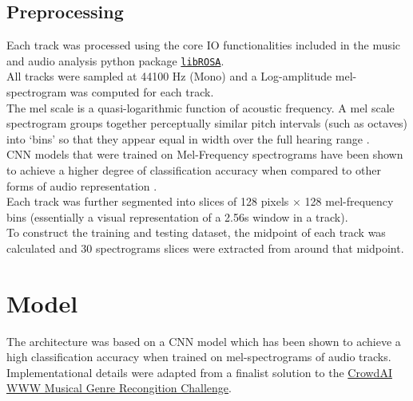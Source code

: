 \documentclass[12pt]{article}
\newcounter{ct}
\begin{document}
\subsection*{Preprocessing}
Each track was processed using the core IO functionalities included
in the music and audio analysis python package 
\href{http://librosa.github.io/librosa/}{\tt libROSA}\cite{c8}.\\
All tracks were sampled at 44100 Hz (Mono) and a 
Log-amplitude mel-spectrogram
was computed for each track.\\ 
The mel scale is a quasi-logarithmic function of acoustic frequency.
A mel scale spectrogram 
groups together perceptually similar 
pitch intervals (such as octaves) into `bins' so that
they appear equal in width over the full hearing range \cite{c9}.\\
CNN models that were trained on Mel-Frequency spectrograms
have been shown to achieve a higher degree
of classification accuracy when compared to other forms of audio
representation \cite{c6}.\\
Each track was further segmented into slices of 128 pixels $\times$
128 mel-frequency bins (essentially a visual representation 
of a 2.56s window in a track).\\
To construct the training and testing dataset, the midpoint of 
each track was calculated and 30 spectrograms slices were extracted
from around that midpoint.
\begin{center}
\end{center}


\section*{Model}
The architecture was based on a CNN model which has been 
shown to achieve a high classification accuracy when trained on 
mel-spectrograms of audio tracks\cite{c4}.\\ Implementational details
were adapted from a finalist solution to the 
\href{https://www.crowdai.org/challenges/www-2018-challenge-learning-to-recognize-musical-genre}
{CrowdAI WWW Musical Genre Recongition Challenge}. 
\end{document}
